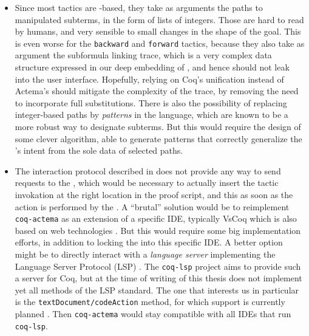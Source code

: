 \begin{itemize}
  \item Since most tactics are -based, they take as arguments the
  paths to manipulated subterms, in the form of lists of integers. Those are
  hard to read by humans, and very sensible to small changes in the shape of the
  goal. This is even worse for the \texttt{backward} and \texttt{forward}
  tactics, because they also take as argument the subformula linking trace,
  which is a very complex data structure expressed in our deep embedding of
  , and hence should not leak into the user interface.
  Hopefully, relying on Coq's unification instead of Actema's should mitigate
  the complexity of the trace, by removing the need to incorporate full
  substitutions. There is also the possibility of replacing integer-based paths
  by \emph{patterns} in the {\ssreflect} language, which are known to be a more
  robust way to designate subterms. But this would require the design of some
  clever algorithm, able to generate patterns that correctly generalize the
  's intent from the sole data of selected paths.

  \item The interaction protocol described in  does not provide
  any way to send requests to the , which would be necessary to
  actually insert the tactic invokation at the right location in the proof
  script, and this as soon as the action is performed by the . A
  ``brutal'' solution would be to reimplement \texttt{coq-actema} as an
  extension of a specific IDE, typically VsCoq which is also based on web
  technologies \cite{VsCoq}. But this would require some big implementation
  efforts, in addition to locking the  into this specific IDE. A
  better option might be to directly interact with a \emph{language server}
  implementing the Language Server Protocol (LSP) \cite{LSP}. The
  \texttt{coq-lsp} project aims to provide such a server for Coq, but at the
  time of writing of this thesis does not implement yet all methods of the LSP
  standard. The one that interests us in particular is the
  \texttt{textDocument/codeAction} method, for which support is currently
  planned \cite{coq-lsp-proto}. Then \texttt{coq-actema} would stay compatible
  with all IDEs that run \texttt{coq-lsp}.
\end{itemize}